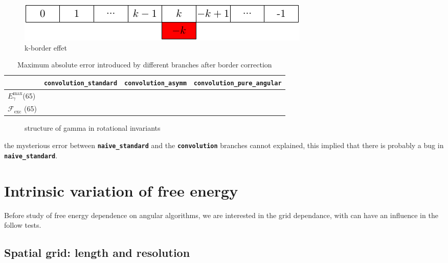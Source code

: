 \begin{figure}[h]
\begin{centering}
\includegraphics{_figure/k-border}
\par\end{centering}

\caption{k-border effet}
\end{figure}


\begin{table}[h]
\begin{centering}
\begin{tabular*}{1\linewidth}{@{\extracolsep{\fill}}llll}
\toprule 
 & \texttt{\textbf{convolution\_standard}} & \texttt{\textbf{convolution\_asymm}} & \texttt{\textbf{convolution\_pure\_angular}}\tabularnewline
\midrule
$E_{\gamma}^{\max}$(65) &  &  & \tabularnewline
$\mathcal{F}_{\mathrm{exc}}$ (65) &  &  & \tabularnewline
\bottomrule
\end{tabular*}
\par\end{centering}

\caption[]{Maximum absolute error introduced by different branches after border
correction}
\end{table}


\begin{figure}
\caption{structure of gamma in rotational invariants}
\end{figure}


the mysterious error between \texttt{\textbf{naive\_standard}} and
the \texttt{\textbf{convolution}} branches cannot explained, this
implied that there is probably a bug in \texttt{\textbf{naive\_standard}}. 


\section{Intrinsic variation of free energy}

Before study of free energy dependence on angular algorithms, we are
interested in the grid dependance, with can have an influence in the
follow tests.


\subsection{Spatial grid: length and resolution}


